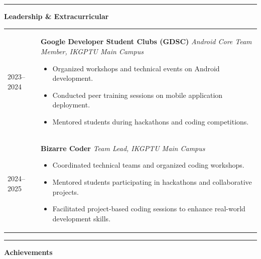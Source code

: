 \documentclass[11pt]{article}
\newcommand{\cvsection}[1]{%
\vspace{12pt}%
\noindent%
{\color{headingblue}\rule{40pt}{5pt}}%
\hspace{10pt}%
{\Large\textbf{\color{headingblue}#1}}%
\vspace{6pt}%
\color{black}%
}
\begin{document}

\newpage
\cvsection{Leadership \& Extracurricular}

\begingroup
\renewcommand{\arraystretch}{1.1}
\begin{tabularx}{\textwidth}{@{}p{95pt}X@{}}

2023--2024 &
\textbf{Google Developer Student Clubs (GDSC)} \hfill \textit{Android Core Team Member, IKGPTU Main Campus}

\begin{itemize}[leftmargin=*,nosep]
\item Organized workshops and technical events on Android development.
\item Conducted peer training sessions on mobile application deployment.
\item Mentored students during hackathons and coding competitions.
\end{itemize}
\\[6pt]

2024--2025 &
\textbf{Bizarre Coder} \hfill \textit{Team Lead, IKGPTU Main Campus}

\begin{itemize}[leftmargin=*,nosep]
\item Coordinated technical teams and organized coding workshops.
\item Mentored students participating in hackathons and collaborative projects.
\item Facilitated project-based coding sessions to enhance real-world development skills.
\end{itemize}

\end{tabularx}
\endgroup


\cvsection{Achievements}
\end{document}
